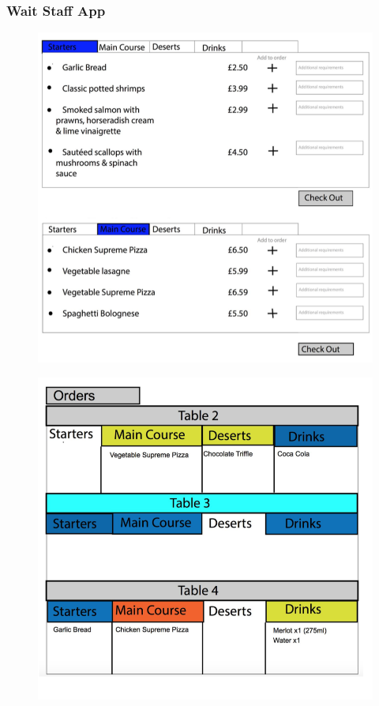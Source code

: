 \documentclass[11pt, a4paper]{report}
\begin{document}
\subsubsection{Wait Staff App} 
\begin{figure}
\centering
\includegraphics[scale=0.8]{Figures/WaitStaffApp.png}
\end{figure}
\begin{figure}
\centering
\includegraphics[scale=0.8]{Figures/KitchenDisplay.png}
\end{figure}
\end{document}
